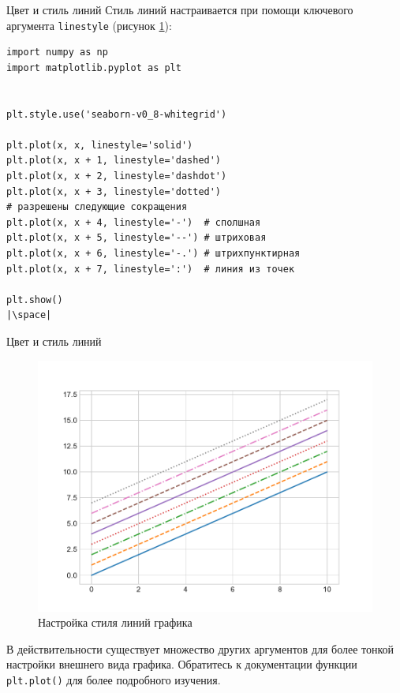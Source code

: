 \documentclass[aspectratio=169, mathserif]{beamer}	%
\begin{document}
\begin{frame}[fragile, label=m]{Цвет и стиль линий}
\scriptsize
Стиль линий настраивается при помощи ключевого аргумента \texttt{linestyle} (рисунок \ref{fig:fig_7}):
\vfill
\begin{verbatim}
import numpy as np
import matplotlib.pyplot as plt


plt.style.use('seaborn-v0_8-whitegrid')

plt.plot(x, x, linestyle='solid')
plt.plot(x, x + 1, linestyle='dashed')
plt.plot(x, x + 2, linestyle='dashdot')
plt.plot(x, x + 3, linestyle='dotted')
# разрешены следующие сокращения
plt.plot(x, x + 4, linestyle='-')  # сполшная
plt.plot(x, x + 5, linestyle='--') # штриховая
plt.plot(x, x + 6, linestyle='-.') # штрихпунктирная
plt.plot(x, x + 7, linestyle=':')  # линия из точек

plt.show()
|\space|
\end{verbatim}
\vfill
\end{frame}

\begin{frame}[fragile, label=m]{Цвет и стиль линий}
\scriptsize
\begin{figure}[h!]
	\centering
	\includegraphics[width=.5\linewidth]{./pics/Figure_7}
	\caption{Настройка стиля линий графика}
	\label{fig:fig_7}
\end{figure}
\vfill
В действительности существует множество других аргументов для более тонкой настройки внешнего вида графика. Обратитесь к документации функции \texttt{plt.plot()} для более подробного изучения.
\vfill
\end{frame}
\end{document}
